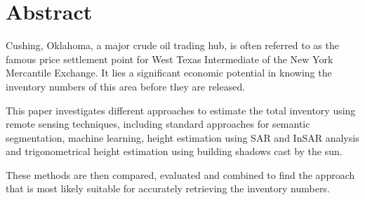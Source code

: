 \section*{Abstract}
Cushing, Oklahoma, a major crude oil trading hub, is often referred to as the famous price settlement point for West Texas Intermediate of the New York Mercantile Exchange. It lies a significant economic potential in knowing the inventory numbers of this area before they are released.

This paper investigates different approaches to estimate the total inventory using remote sensing techniques, including standard approaches for semantic segmentation, machine learning, height estimation using SAR and InSAR analysis and trigonometrical height estimation using building shadows cast by the sun.

These methods are then compared, evaluated and combined to find the approach that is most likely suitable for accurately retrieving the inventory numbers.